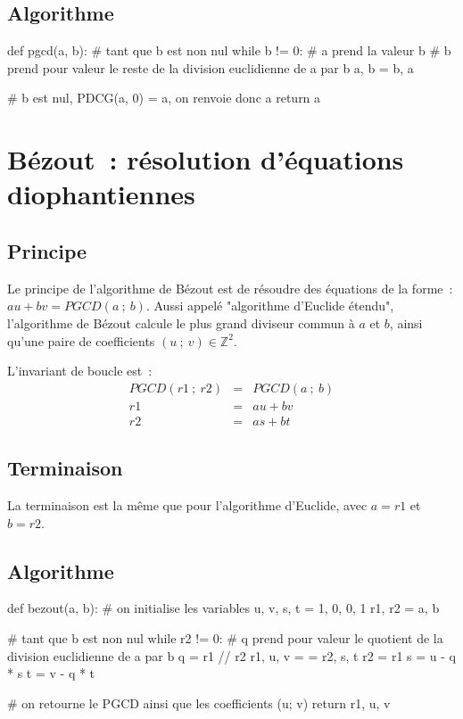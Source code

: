 	\subsection{Algorithme}
		
		\begin{pythoncode}
			def pgcd(a, b):
				# tant que b est non nul
				while b != 0:
					# a prend la valeur b
					# b prend pour valeur le reste de la division euclidienne de a par b
					a, b = b, a %
				
				# b est nul, PDCG(a, 0) = a, on renvoie donc a
				return a
		\end{pythoncode}

\section{Bézout~: résolution d'équations diophantiennes}

	\subsection{Principe}
	
		Le principe de l'algorithme de Bézout est de résoudre des équations de la forme~: $au + bv = PGCD(a~;\ b)$. Aussi appelé "algorithme d'Euclide étendu", l'algorithme de Bézout calcule le plus grand diviseur commun à $a$ et $b$, ainsi qu'une paire de coefficients $(u~;\ v) \in \mathbb{Z}^2$.
		
		L'invariant de boucle est~:
		\[ \begin{array}{rcl}
			PGCD(r1~;\ r2) & = & PGCD(a~;\ b) \\
			r1 & = & au + bv \\
			r2 & = & as + bt
		\end{array} \]
	
	\subsection{Terminaison}
	
		La terminaison est la même que pour l'algorithme d'Euclide, avec $a = r1$ et $b = r2$.
	
	\subsection{Algorithme}
	
		\begin{pythoncode}
			def bezout(a, b):
				# on initialise les variables
				u, v, s, t = 1, 0, 0, 1
				r1, r2 = a, b
				
				# tant que b est non nul
				while r2 != 0:
					# q prend pour valeur le quotient de la division euclidienne de a par b
					q = r1 // r2
					r1, u, v = = r2, s, t
					r2 = r1 %
					s = u - q * s
					t = v - q * t
					
				# on retourne le PGCD ainsi que les coefficients (u; v)
				return r1, u, v
		\end{pythoncode}

